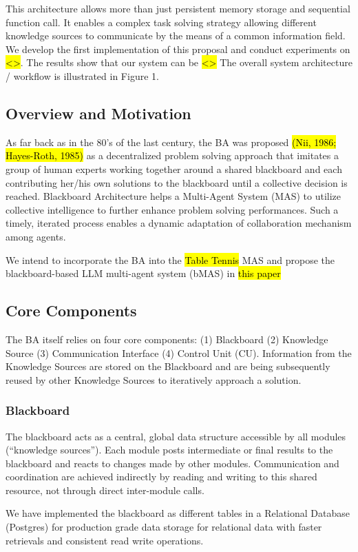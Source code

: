\documentclass[conference]{IEEEtran}
\begin{document}
This architecture allows more than just persistent memory storage and sequential function call. It enables a complex task 
solving strategy allowing different knowledge sources to communicate by the means of a common information field. 
We develop the first implementation of this proposal and conduct experiments on \hl{<>}. The results show that our system can be \hl{<>}
The overall system architecture / workflow is illustrated in Figure 1.
\subsection{Overview and Motivation}
As far back as in the 80’s of the last century, the BA was proposed \hl{(Nii, 1986; Hayes-Roth, 1985)} as a decentralized problem solving approach that imitates a group of human experts working together around a shared blackboard and each contributing her/his own solutions to the blackboard until a collective decision is reached. 
Blackboard Architecture helps a Multi-Agent System (MAS) to utilize collective intelligence to further enhance problem solving performances. 
Such a timely, iterated process enables a dynamic adaptation of collaboration mechanism among agents.

We intend to incorporate the BA into the \hl{Table Tennis} MAS and propose the blackboard-based LLM multi-agent system (bMAS) in \hl{this paper}
\subsection{Core Components}
The BA itself relies on four core components: (1) Blackboard (2) Knowledge Source (3) Communication Interface (4) Control Unit (CU). Information from the Knowledge Sources are stored on the Blackboard and are being subsequently reused by other Knowledge Sources to iteratively approach a solution. 
\subsubsection{Blackboard}
The blackboard acts as a central, global data structure accessible by all modules (“knowledge sources”).
Each module posts intermediate or final results to the blackboard and reacts to changes made by other modules.
Communication and coordination are achieved indirectly by reading and writing to this shared resource, not through direct inter-module calls.

We have implemented the blackboard as different tables in a Relational Database (Postgres) for production grade data storage for relational data with faster retrievals and consistent read write operations.
\end{document}
